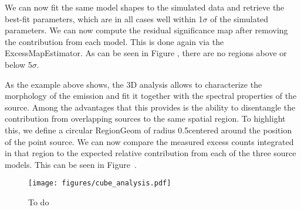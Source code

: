 We can now fit the same model shapes to the simulated data and retrieve the best-fit parameters, which are in all cases well within 1$\sigma$ of the simulated parameters. We can now compute the residual significance map after removing the contribution from each model. This is done again via the ExcessMapEstimator. As can be seen in Figure , there are no regions above or below 5$\sigma$.

As the example above shows, the 3D analysis allows to characterize the morphology of the emission and fit it together with the spectral properties of the source.  Among the advantages that this provides is the ability to disentangle the contribution from overlapping sources to the same spatial region. To highlight this, we define a circular RegionGeom of radius 0.5\textdegree centered around the position of the point source. We can now compare the measured excess counts integrated in that region to the expected relative contribution from each of the three source models. This can be seen in Figure~.

\begin{figure*}[t]
	\centering
	\texttt{[image: figures/cube\_analysis.pdf]}
	\caption{To do
	}
	\label{fig:cube_analysis}
\end{figure*}

%
